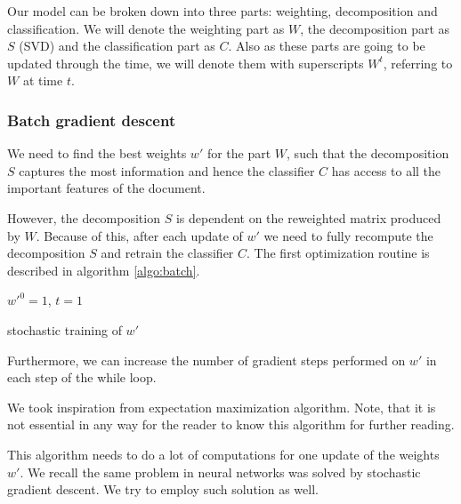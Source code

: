     Our model can be broken down into three parts: weighting, decomposition and classification.
    We will denote the weighting part as $W$, the decomposition part as $S$ (SVD) and the classification part as $C$.
    Also as these parts are going to be updated through the time, we will denote them with superscripts $W^t$, referring to $W$ at time $t$.
    
    
    \subsubsection{Batch gradient descent}
    
    We need to find the best weights $w'$ for the part $W$, 
    such that the decomposition $S$ captures the most information and hence the classifier $C$ has access to all the important features of the document.
    
    However, the decomposition $S$ is dependent on the reweighted matrix produced by $W$. 
    Because of this, after each update of $w'$ we need to fully recompute the decomposition $S$ and retrain the classifier $C$.
    The first optimization routine is described in algorithm \ref{algo:batch}.
    
    \medskip
    
    \begin{algorithm}[H]
        $w'^0 = 1$, $t=1$\;
        \caption{stochastic training of $w'$} \label{algo:batch}
    \end{algorithm}
    
    Furthermore, we can increase the number of gradient steps performed on $w'$ in each step of the while loop.
    
    We took inspiration from expectation maximization algorithm.  
    Note, that it is not essential in any way for the reader to know this algorithm for further reading.
    
    This algorithm needs to do a lot of computations for one update of the weights $w'$.
    We recall the same problem in neural networks was solved by stochastic gradient descent.
    We try to employ such solution as well.
    
